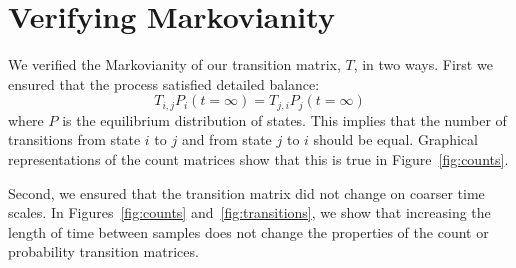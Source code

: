 \documentclass{article}
\begin{document}
  
  \newpage
  
  \section{Verifying Markovianity}\label{section:markov_validation}
  
  We verified the Markovianity of our transition matrix, $T$, in two ways. First we 
  ensured that the process satisfied detailed balance:
  \begin{equation}
  T_{i,j}P_i(t=\infty) = T_{j,i}P_j(t=\infty)
  \end{equation}
  where $P$ is the equilibrium distribution of states. This implies that the number
  of transitions from state $i$ to $j$ and from state $j$ to $i$ should be equal. Graphical 
  representations of the count matrices show that this is true in Figure~\ref{fig:counts}. 
  
  Second, we ensured that the transition matrix did not change on coarser time scales.
  In Figures~\ref{fig:counts} and~\ref{fig:transitions}, we show that increasing the 
  length of time between samples does not change the properties of the count or
  probability transition matrices.
  
\end{document}
